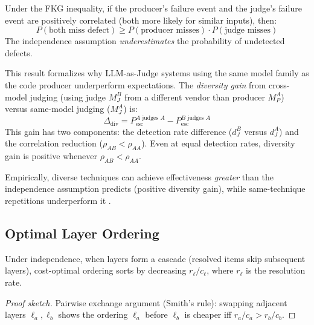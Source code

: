 \begin{proposition}
\label{prop:fkg}
Under the FKG inequality, if the producer's failure event and the judge's failure event are positively correlated (both more likely for similar inputs), then:
\begin{equation}
    P(\text{both miss defect}) \geq P(\text{producer misses}) \cdot P(\text{judge misses})
\end{equation}
The independence assumption \emph{underestimates} the probability of undetected defects.
\end{proposition}

This result formalizes why LLM-as-Judge systems using the same model family as the code producer underperform expectations. The \emph{diversity gain} from cross-model judging (using judge $M_J^B$ from a different vendor than producer $M_P^A$) versus same-model judging ($M_J^A$) is:
\begin{equation}
\Delta_{\mathrm{div}} = P_{\mathrm{esc}}^{A \text{ judges } A} - P_{\mathrm{esc}}^{B \text{ judges } A}
\end{equation}
This gain has two components: the detection rate difference ($d_J^B$ versus $d_J^A$) and the correlation reduction ($\rho_{AB} < \rho_{AA}$). Even at equal detection rates, diversity gain is positive whenever $\rho_{AB} < \rho_{AA}$.

Empirically, diverse techniques can achieve effectiveness \emph{greater} than the independence assumption predicts (positive diversity gain), while same-technique repetitions underperform it \citep{littlewood2000}.

\subsection{Optimal Layer Ordering}

\begin{theorem}
\label{thm:roi-ordering}
Under independence, when layers form a cascade (resolved items skip subsequent layers), cost-optimal ordering sorts by decreasing $r_\ell / c_\ell$, where $r_\ell$ is the resolution rate.
\end{theorem}

\begin{proof}[Proof sketch]
Pairwise exchange argument (Smith's rule): swapping adjacent layers $\ell_a, \ell_b$ shows the ordering $\ell_a$ before $\ell_b$ is cheaper iff $r_a / c_a > r_b / c_b$.
\end{proof}

